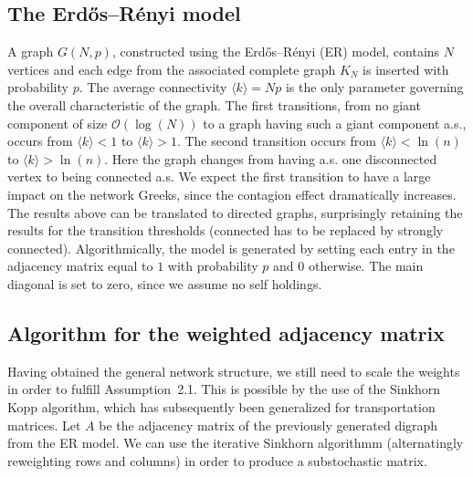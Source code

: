 \documentclass{article}
\begin{document}
\subsection{The Erd\H{o}s–R\'enyi model}
A graph $G(N,p)$, constructed using the Erd\H{o}s–R\'enyi (ER) model, contains $N$ vertices and each edge from the associated complete graph $K_N$ is inserted with probability $p$.
The average connectivity $\langle k \rangle = N p$ is the only parameter governing the overall characteristic of the graph.
The first transitions, from no giant component of size $\mathcal{O}(\log(N))$ to a graph having such a giant component a.s., occurs from ${\langle k \rangle < 1}$ to ${\langle k \rangle > 1}$.
The second transition occurs from $\langle k \rangle < \ln (n)$ to $\langle k \rangle > \ln (n)$.
Here the graph changes from having a.s. one disconnected vertex to being connected a.s.
We expect the first transition to have a large impact on the network Greeks, since the contagion effect dramatically increases.
The results above can be translated to directed graphs, surprisingly retaining the results for the transition thresholds (connected has to be replaced by strongly connected).
Algorithmically, the model is generated by setting each entry in the adjacency matrix equal to $1$ with probability $p$ and $0$ otherwise.
The main diagonal is set to zero, since we assume no self holdings.





\subsection{Algorithm for the weighted adjacency matrix}
Having obtained the general network structure, we still need to scale the weights in order to fulfill Assumption~2.1.
This is possible by the use of the Sinkhorn Kopp algorithm, which has subsequently been generalized for transportation matrices.
Let $A$ be the adjacency matrix of the previously generated digraph from the ER model.
We can use the iterative Sinkhorn algorithmm (alternatingly reweighting rows and columns) in order to produce a substochastic matrix.
\end{document}

